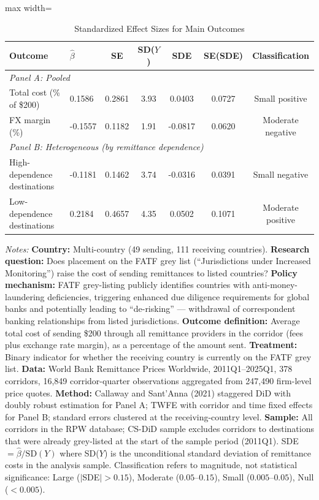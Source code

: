 \begin{table}[H]
\centering
\caption{Standardized Effect Sizes for Main Outcomes}
\label{tab:sde}
\begin{threeparttable}
\footnotesize
\begin{adjustbox}{max width=\textwidth}
\begin{tabular}{llccccc}
\toprule
Outcome & $\hat{\beta}$ & SE & SD($Y$) & SDE & SE(SDE) & Classification \\
\midrule
\multicolumn{7}{l}{\textit{Panel A: Pooled}} \\
Total cost (\% of \$200) & 0.1586 & 0.2861 & 3.93 & 0.0403 & 0.0727 & Small positive \\
FX margin (\%) & -0.1557 & 0.1182 & 1.91 & -0.0817 & 0.0620 & Moderate negative \\
\midrule
\multicolumn{7}{l}{\textit{Panel B: Heterogeneous (by remittance dependence)}} \\
High-dependence destinations & -0.1181 & 0.1462 & 3.74 & -0.0316 & 0.0391 & Small negative \\
Low-dependence destinations & 0.2184 & 0.4657 & 4.35 & 0.0502 & 0.1071 & Moderate positive \\
\bottomrule
\end{tabular}
\end{adjustbox}
\begin{tablenotes}[flushleft]
\footnotesize\sloppy
\item \textit{Notes:} \textbf{Country:} Multi-country (49 sending, 111 receiving countries). \textbf{Research question:} Does placement on the FATF grey list (``Jurisdictions under Increased Monitoring'') raise the cost of sending remittances to listed countries? \textbf{Policy mechanism:} FATF grey-listing publicly identifies countries with anti-money-laundering deficiencies, triggering enhanced due diligence requirements for global banks and potentially leading to ``de-risking'' --- withdrawal of correspondent banking relationships from listed jurisdictions. \textbf{Outcome definition:} Average total cost of sending \$200 through all remittance providers in the corridor (fees plus exchange rate margin), as a percentage of the amount sent. \textbf{Treatment:} Binary indicator for whether the receiving country is currently on the FATF grey list. \textbf{Data:} World Bank Remittance Prices Worldwide, 2011Q1--2025Q1, 378 corridors, 16,849 corridor-quarter observations aggregated from 247,490 firm-level price quotes. \textbf{Method:} Callaway and Sant'Anna (2021) staggered DiD with doubly robust estimation for Panel A; TWFE with corridor and time fixed effects for Panel B; standard errors clustered at the receiving-country level. \textbf{Sample:} All corridors in the RPW database; CS-DiD sample excludes corridors to destinations that were already grey-listed at the start of the sample period (2011Q1). SDE $= \hat{\beta} / \text{SD}(Y)$ where SD($Y$) is the unconditional standard deviation of remittance costs in the analysis sample. Classification refers to magnitude, not statistical significance: Large ($|$SDE$| > 0.15$), Moderate ($0.05$--$0.15$), Small ($0.005$--$0.05$), Null ($< 0.005$).
\end{tablenotes}
\end{threeparttable}
\end{table}
